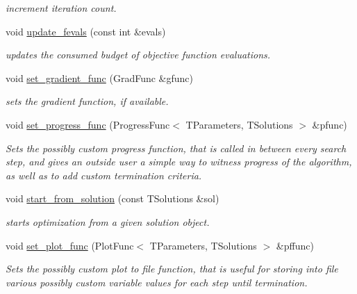 \begin{DoxyCompactItemize}
\begin{DoxyCompactList}\small\item\em increment iteration count. \end{DoxyCompactList}\item 
void \hyperlink{classlibcmaes_1_1ESOStrategy_a9cfe783dc0284fce441c8757cd5222c3}{update\+\_\+fevals} (const int \&evals)
\begin{DoxyCompactList}\small\item\em updates the consumed budget of objective function evaluations. \end{DoxyCompactList}\item 
void \hyperlink{classlibcmaes_1_1ESOStrategy_aecb8aeecb2053868a7d9237223067267}{set\+\_\+gradient\+\_\+func} (Grad\+Func \&gfunc)
\begin{DoxyCompactList}\small\item\em sets the gradient function, if available. \end{DoxyCompactList}\item 
void \hyperlink{classlibcmaes_1_1ESOStrategy_a9d44ba79106b6afbd5881c4f33800840}{set\+\_\+progress\+\_\+func} (Progress\+Func$<$ T\+Parameters, T\+Solutions $>$ \&pfunc)
\begin{DoxyCompactList}\small\item\em Sets the possibly custom progress function, that is called in between every search step, and gives an outside user a simple way to witness progress of the algorithm, as well as to add custom termination criteria. \end{DoxyCompactList}\item 
void \hyperlink{classlibcmaes_1_1ESOStrategy_afa0e2a388dae01ec485c3dd8d80bb5ed}{start\+\_\+from\+\_\+solution} (const T\+Solutions \&sol)
\begin{DoxyCompactList}\small\item\em starts optimization from a given solution object. \end{DoxyCompactList}\item 
void \hyperlink{classlibcmaes_1_1ESOStrategy_ac0cdfca8b5614843661af4153e8c6b51}{set\+\_\+plot\+\_\+func} (Plot\+Func$<$ T\+Parameters, T\+Solutions $>$ \&pffunc)
\begin{DoxyCompactList}\small\item\em Sets the possibly custom plot to file function, that is useful for storing into file various possibly custom variable values for each step until termination. \end{DoxyCompactList}\item 

\end{DoxyCompactItemize}
